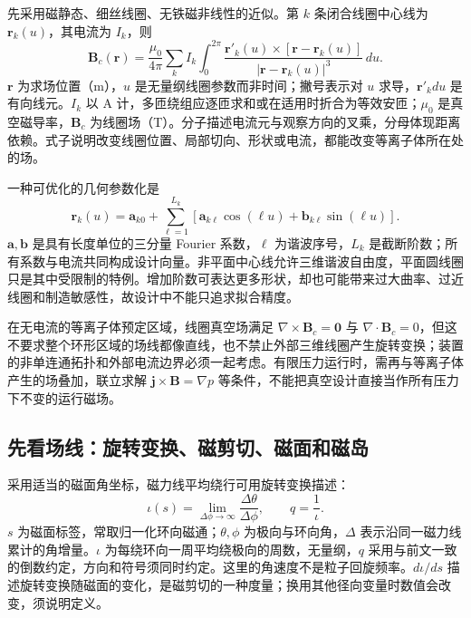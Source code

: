 \documentclass[12pt,fontset=none]{ctexart}
\numberwithin{equation}{section}
\numberwithin{table}{section}
\numberwithin{figure}{section}
\begin{document}
先采用磁静态、细丝线圈、无铁磁非线性的近似。第 $k$ 条闭合线圈中心线为 $\bm r_k(u)$，其电流为 $I_k$，则
\begin{equation}\label{eq:stellarator-biot}
 \bm B_c(\bm r)=\frac{\mu_0}{4\pi}\sum_k I_k
 \int_0^{2\pi}\frac{\bm r'_k(u)\times[\bm r-\bm r_k(u)]}
 {|\bm r-\bm r_k(u)|^3}\,du.
\end{equation}
$\bm r$ 为求场位置（m），$u$ 是无量纲线圈参数而非时间；撇号表示对 $u$ 求导，$\bm r'_kdu$ 是有向线元。$I_k$ 以 A 计，多匝绕组应逐匝求和或在适用时折合为等效安匝；$\mu_0$ 是真空磁导率，$\bm B_c$ 为线圈场（T）。分子描述电流元与观察方向的叉乘，分母体现距离依赖。式子说明改变线圈位置、局部切向、形状或电流，都能改变等离子体所在处的场。

一种可优化的几何参数化是
\begin{equation}\label{eq:stellarator-coil-fourier}
 \bm r_k(u)=\bm a_{k0}+\sum_{\ell=1}^{L_k}
 [\bm a_{k\ell}\cos(\ell u)+\bm b_{k\ell}\sin(\ell u)].
\end{equation}
$\bm a,\bm b$ 是具有长度单位的三分量 Fourier 系数，$\ell$ 为谐波序号，$L_k$ 是截断阶数；所有系数与电流共同构成设计向量。非平面中心线允许三维谐波自由度，平面圆线圈只是其中受限制的特例。增加阶数可表达更多形状，却也可能带来过大曲率、过近线圈和制造敏感性，故设计中不能只追求拟合精度。

在无电流的等离子体预定区域，线圈真空场满足 $\nabla\times\bm B_c=\bm0$ 与 $\nabla\cdot\bm B_c=0$，但这不要求整个环形区域的场线都像直线，也不禁止外部三维线圈产生旋转变换；装置的非单连通拓扑和外部电流边界必须一起考虑。有限压力运行时，需再与等离子体产生的场叠加，联立求解 $\bm j\times\bm B=\nabla p$ 等条件，不能把真空设计直接当作所有压力下不变的运行磁场。

\subsection{先看场线：旋转变换、磁剪切、磁面和磁岛}\label{sec:stellarator-topology}

采用适当的磁面角坐标，磁力线平均绕行可用旋转变换描述：
\begin{equation}\label{eq:stellarator-iota}
 \iota(s)=\lim_{\Delta\phi\to\infty}\frac{\Delta\theta}{\Delta\phi},
 \qquad q=\frac1\iota.
\end{equation}
$s$ 为磁面标签，常取归一化环向磁通；$\theta,\phi$ 为极向与环向角，$\Delta$ 表示沿同一磁力线累计的角增量。$\iota$ 为每绕环向一周平均绕极向的周数，无量纲，$q$ 采用与前文一致的倒数约定，方向和符号须同时约定。这里的角速度不是粒子回旋频率。$d\iota/ds$ 描述旋转变换随磁面的变化，是磁剪切的一种度量；换用其他径向变量时数值会改变，须说明定义。
\end{document}

